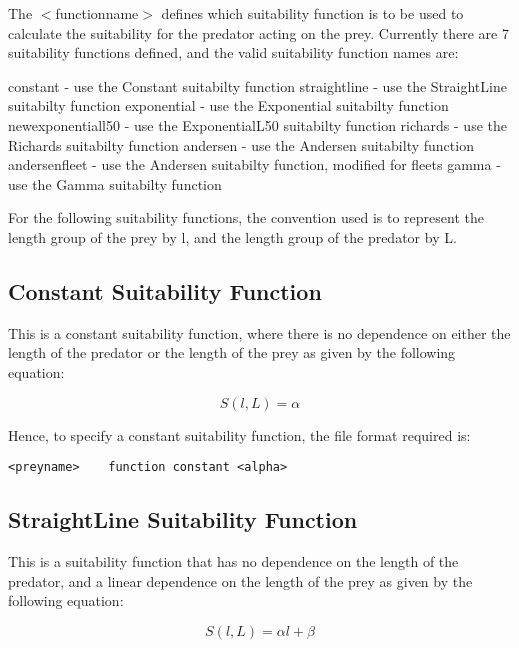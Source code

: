 \documentclass[]{book}
\begin{document}
The \(<\)functionname\(>\) defines which suitability function is to be used
to calculate the suitability for the predator acting on the prey.
Currently there are 7 suitability functions defined, and the valid
suitability function names are:

constant - use the Constant suitabilty function straightline - use the
StraightLine suitabilty function exponential - use the Exponential
suitabilty function newexponentiall50 - use the ExponentialL50
suitabilty function richards - use the Richards suitabilty function
andersen - use the Andersen suitabilty function andersenfleet - use the
Andersen suitabilty function, modified for fleets gamma - use the Gamma
suitabilty function

For the following suitability functions, the convention used is to
represent the length group of the prey by l, and the length group of the
predator by L.

\hypertarget{constant-suitability-function}{%
\subsection{Constant Suitability Function}\label{constant-suitability-function}}

This is a constant suitability function, where there is no dependence on
either the length of the predator or the length of the prey as given by
the following equation:

\begin{equation}
\label{eq:constsuit}
S(l, L) = \alpha\end{equation}

Hence, to specify a constant suitability function, the file format
required is:

\begin{verbatim}
<preyname>    function constant <alpha>
\end{verbatim}

\hypertarget{straightline-suitability-function}{%
\subsection{StraightLine Suitability Function}\label{straightline-suitability-function}}

This is a suitability function that has no dependence on the length of
the predator, and a linear dependence on the length of the prey as given
by the following equation:

\begin{equation}
\label{eq:straightsuit}
S(l, L) = \alpha l + \beta\end{equation}
\end{document}
